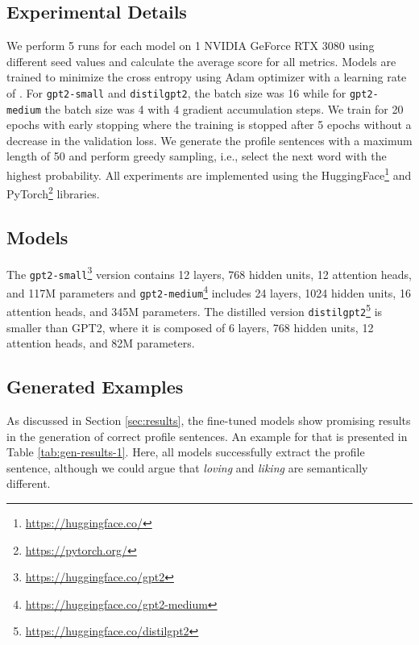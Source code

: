 \documentclass[11pt]{article}
\begin{document}
\subsection{Experimental Details}
\label{appendix:generation-details}

We perform 5 runs for each model on 1 NVIDIA GeForce RTX 3080 using different seed values and calculate the average score for all metrics.
Models are trained to minimize the cross entropy using Adam \cite{ADAM} optimizer with a learning rate of .
For \texttt{gpt2-small} and \texttt{distilgpt2}, the batch size was 16 while for \texttt{gpt2-medium} the batch size was 4 with 4 gradient accumulation steps.
We train for 20 epochs with early stopping where the training is stopped after 5 epochs without a decrease in the validation loss.
We generate the profile sentences with a maximum length of 50 and perform greedy sampling, i.e., select the next word with the highest probability.
All experiments are implemented using the HuggingFace\footnote{\href{https://huggingface.co/}{https://huggingface.co/}} and PyTorch\footnote{\href{https://pytorch.org/}{https://pytorch.org/}} libraries.

\subsection{Models}
\label{appendix:models}
The \texttt{gpt2-small}\footnote{\href{https://huggingface.co/gpt2}{https://huggingface.co/gpt2}} version contains 12 layers, 768 hidden units, 12 attention heads, and 117M parameters and \texttt{gpt2-medium}\footnote{\href{https://huggingface.co/gpt2-medium}{https://huggingface.co/gpt2-medium}} includes 24 layers, 1024 hidden units, 16 attention heads, and 345M parameters.
The distilled version \texttt{distilgpt2}\footnote{\href{https://huggingface.co/distilgpt2}{https://huggingface.co/distilgpt2}} \cite{DISTIL} is smaller than GPT2, where it is composed of 6 layers, 768 hidden units, 12 attention heads, and 82M parameters.

\subsection{Generated Examples}
\label{appendix:gen-examples}

As discussed in Section \ref{sec:results}, the fine-tuned models show promising results in the generation of correct profile sentences.
An example for that is presented in Table \ref{tab:gen-results-1}.
Here, all models successfully extract the profile sentence, although we could argue that \textit{loving} and \textit{liking} are semantically different.
\end{document}
